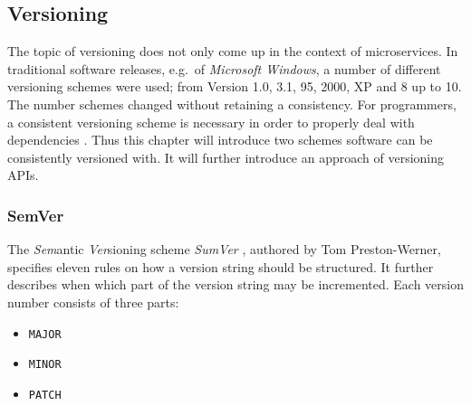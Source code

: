 
\subsection{Versioning}%
\label{sub:Versioning}
The topic of versioning does not only come up in the context of microservices.
In traditional software releases, e.g.\ of \textit{Microsoft Windows}, a number
of different versioning schemes were used; from Version 1.0, 3.1, 95, 2000, XP
and 8 up to 10. The number schemes changed without retaining a consistency. For
programmers, a consistent versioning scheme is necessary in order to properly
deal with dependencies \autocite{Preston-WernerSemanticVersioning2.0.0}. Thus
this chapter will introduce two schemes software can be consistently versioned
with. It will further introduce an approach of versioning \acp{API}.

\subsubsection{SemVer}%
\label{ssub:SemVer}
The \textit{Sem}antic \textit{Ver}sioning scheme \textit{SumVer}
\autocite{Preston-WernerSemanticVersioning2.0.0}, authored by Tom
Preston-Werner, specifies eleven rules on how a version string should be
structured. It further describes when which part of the version string may be
incremented. Each version number consists of three parts:

\begin{itemize}
  \item \texttt{MAJOR}
  \item \texttt{MINOR}
  \item \texttt{PATCH}
\end{itemize}

